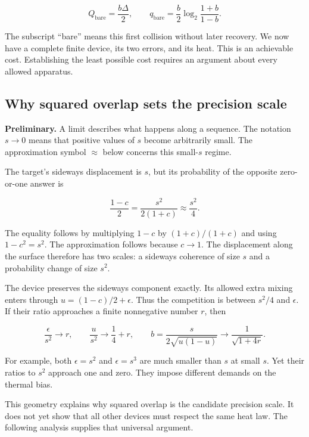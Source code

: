 \documentclass[11pt,letterpaper]{article}
\begin{document}
\[Q_{\mathrm{bare}} = \frac{b\Delta}{2},\quad\quad q_{\mathrm{bare}} = \frac{b}{2}\log_{2}\frac{1 + b}{1 - b}.\]

The subscript ``bare'' means this first collision without later recovery. We now have a complete finite device, its two errors, and its heat. This is an achievable cost. Establishing the least possible cost requires an argument about every allowed apparatus.

\subsection{Why squared overlap sets the precision scale}\label{subsec:squared-overlap}

\textbf{Preliminary.} A limit describes what happens along a sequence. The notation \(s \rightarrow 0\) means that positive values of \(s\) become arbitrarily small. The approximation symbol \(\approx\) below concerns this small-\(s\) regime.

The target's sideways displacement is \(s\), but its probability of the opposite zero-or-one answer is

\[\frac{1 - c}{2} = \frac{s^{2}}{2(1 + c)} \approx \frac{s^{2}}{4}.\]

The equality follows by multiplying \(1 - c\) by \((1 + c)/(1 + c)\) and using \(1 - c^{2} = s^{2}\). The approximation follows because \(c \rightarrow 1\). The displacement along the surface therefore has two scales: a sideways coherence of size \(s\) and a probability change of size \(s^{2}\).

The device preserves the sideways component exactly. Its allowed extra mixing enters through \(u = (1 - c)/2 + \epsilon\). Thus the competition is between \(s^{2}/4\) and \(\epsilon\). If their ratio approaches a finite nonnegative number \(r\), then

\[\frac{\epsilon}{s^{2}} \rightarrow r,\quad\quad\frac{u}{s^{2}} \rightarrow \frac{1}{4} + r,\quad\quad b = \frac{s}{2\sqrt{u(1 - u)}} \rightarrow \frac{1}{\sqrt{1 + 4r}}.\]

For example, both \(\epsilon = s^{2}\) and \(\epsilon = s^{3}\) are much smaller than \(s\) at small \(s\). Yet their ratios to \(s^{2}\) approach one and zero. They impose different demands on the thermal bias.

This geometry explains why squared overlap is the candidate precision scale. It does not yet show that all other devices must respect the same heat law. The following analysis supplies that universal argument.
\end{document}
